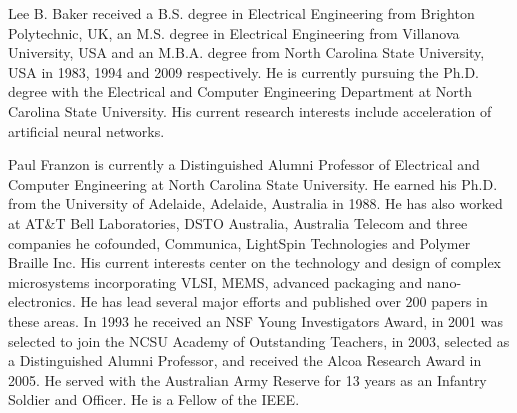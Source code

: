 \documentclass[journal]{IEEEtran}
\begin{document}
% 
\begin{IEEEbiographynophoto}{Lee B. Baker}
received a B.S. degree in Electrical Engineering from Brighton Polytechnic, UK, an M.S. degree in Electrical Engineering from Villanova University, USA and an M.B.A. degree from North Carolina State University, USA in 1983, 1994 and 2009 respectively. He is currently pursuing the Ph.D. degree with the Electrical and Computer Engineering Department at North Carolina State University.
His current research interests include acceleration of artificial neural networks.
\end{IEEEbiographynophoto}
\begin{IEEEbiographynophoto}{Paul Franzon}
is currently a Distinguished Alumni Professor of Electrical and Computer Engineering at North Carolina State University.  He earned his Ph.D. from the University of Adelaide, Adelaide, Australia in 1988.  He has also worked at AT\&T Bell Laboratories, DSTO Australia, Australia Telecom and three companies he cofounded, Communica, LightSpin Technologies and Polymer Braille Inc. His current interests center on the technology and design of complex microsystems incorporating VLSI, MEMS, advanced packaging and nano-electronics. He has lead several major efforts and published over 200 papers in these areas.  In 1993 he received an NSF Young Investigators Award, in 2001 was selected to join the NCSU Academy of Outstanding Teachers, in 2003, selected as a Distinguished Alumni Professor, and received the Alcoa Research Award in 2005.  He served with the Australian Army Reserve for 13 years as an Infantry Soldier and Officer.  He is a Fellow of the IEEE.
\end{IEEEbiographynophoto}






\end{document}
